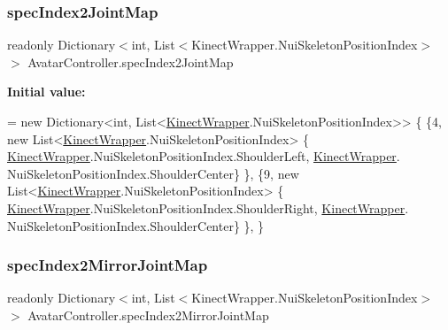 \mbox{\label{class_avatar_controller_a8143c80aaad868c53ca674b41759d82b}} 
\subsubsection{\texorpdfstring{spec\+Index2\+Joint\+Map}{specIndex2JointMap}}
{\footnotesize\ttfamily readonly Dictionary$<$int, List$<$Kinect\+Wrapper.\+Nui\+Skeleton\+Position\+Index$>$ $>$ Avatar\+Controller.\+spec\+Index2\+Joint\+Map\hspace{0.3cm}{\ttfamily [protected]}}

{\bfseries Initial value\+:}
\begin{DoxyCode}
= \textcolor{keyword}{new} Dictionary<int, List<\mbox{\hyperlink{class_kinect_wrapper}{KinectWrapper}}.NuiSkeletonPositionIndex>>
    \{
        \{4, \textcolor{keyword}{new} List<\mbox{\hyperlink{class_kinect_wrapper}{KinectWrapper}}.NuiSkeletonPositionIndex> \{
      \mbox{\hyperlink{class_kinect_wrapper}{KinectWrapper}}.NuiSkeletonPositionIndex.ShoulderLeft, \mbox{\hyperlink{class_kinect_wrapper}{KinectWrapper}}.
      NuiSkeletonPositionIndex.ShoulderCenter\} \},
        \{9, \textcolor{keyword}{new} List<\mbox{\hyperlink{class_kinect_wrapper}{KinectWrapper}}.NuiSkeletonPositionIndex> \{
      \mbox{\hyperlink{class_kinect_wrapper}{KinectWrapper}}.NuiSkeletonPositionIndex.ShoulderRight, \mbox{\hyperlink{class_kinect_wrapper}{KinectWrapper}}.
      NuiSkeletonPositionIndex.ShoulderCenter\} \},
    \}
\end{DoxyCode}
\mbox{\label{class_avatar_controller_ad954ba1369590ca3534bd206eb8bd72a}} 
\subsubsection{\texorpdfstring{spec\+Index2\+Mirror\+Joint\+Map}{specIndex2MirrorJointMap}}
{\footnotesize\ttfamily readonly Dictionary$<$int, List$<$Kinect\+Wrapper.\+Nui\+Skeleton\+Position\+Index$>$ $>$ Avatar\+Controller.\+spec\+Index2\+Mirror\+Joint\+Map\hspace{0.3cm}{\ttfamily [protected]}}

